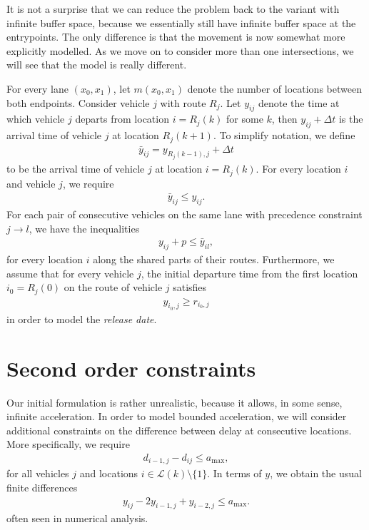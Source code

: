 \documentclass{article}
\theoremstyle{definition}
\theoremstyle{plain}
\begin{document}
It is not a surprise that we can reduce the problem back to the variant with
infinite buffer space, because we essentially still have infinite buffer space
at the entrypoints. The only difference is that the movement is now somewhat
more explicitly modelled. As we move on to consider more than one intersections,
we will see that the model is really different.

{\color{gray} For every lane $(x_{0}, x_{1})$, let $m(x_{0}, x_{1})$ denote the
  number of locations between both endpoints. Consider vehicle $j$ with route
  $R_{j}$. Let $y_{ij}$ denote the time at which vehicle $j$ departs from
  location $i = R_{j}(k)$ for some $k$, then $y_{ij} + \Delta t$ is the arrival
  time of vehicle $j$ at location $R_{j}(k+1)$. To simplify notation, we define
\begin{align}
  \bar{y}_{ij} = y_{R_{j}(k-1),j} + \Delta t
\end{align}
to be the arrival time of vehicle $j$ at location $i = R_{j}(k)$. For every
location $i$ and vehicle $j$, we require
\begin{align}
  \bar{y}_{ij} \leq y_{ij} .
\end{align}
For each pair of consecutive vehicles on the same lane
with precedence constraint $j \rightarrow l$, we have the inequalities
\begin{align}
  y_{ij} + p \leq \bar{y}_{il} ,
\end{align}
for every location $i$ along the shared parts of their routes. Furthermore, we
assume that for every vehicle $j$, the initial departure time from the first
location $i_{0} = R_{j}(0)$ on the route of vehicle $j$ satisfies
\begin{align}
  \label{eq:release}
  y_{i_{0},j} \geq r_{i_{0},j}
\end{align}
in order to model the \textit{release date}.
}


\section{Second order constraints}

Our initial formulation is rather unrealistic, because it allows, in some sense,
infinite acceleration. In order to model bounded acceleration, we will consider
additional constraints on the difference between delay at consecutive locations.
More specifically, we require
\begin{align*}
  d_{i-1,j} - d_{ij} \leq a_{\text{max}} ,
\end{align*}
for all vehicles $j$ and locations $i \in \mathcal{L}(k) \setminus \{ 1 \}$.
In terms of $y$, we obtain the usual finite differences
\begin{align*}
  y_{ij} - 2 y_{i-1,j} + y_{i-2,j} \leq a_{\text{max}} .
\end{align*}
often seen in numerical analysis.


% 
% 
\end{document}

